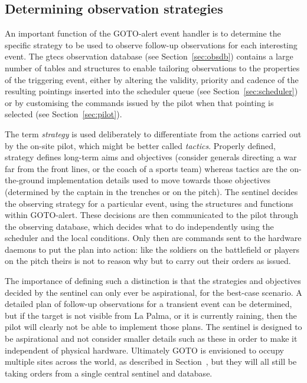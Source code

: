 \begin{colsection}
\subsection{Determining observation strategies}
\label{sec:event_strategy}
\begin{colsection}

An important function of the GOTO-alert event handler is to determine the specific strategy to be used to observe follow-up observations for each interesting event. The \gls{gtecs} observation database (see Section~\ref{sec:obsdb}) contains a large number of tables and structures to enable tailoring observations to the properties of the triggering event, either by altering the validity, priority and cadence of the resulting pointings inserted into the scheduler queue (see Section~\ref{sec:scheduler}) or by customising the commands issued by the pilot when that pointing is selected (see Section~\ref{sec:pilot}).

The term \textit{strategy} is used deliberately to differentiate from the actions carried out by the on-site pilot, which might be better called \textit{tactics}. Properly defined, strategy defines long-term aims and objectives (consider generals directing a war far from the front lines, or the coach of a sports team) whereas tactics are the on-the-ground implementation details used to move towards those objectives (determined by the captain in the trenches or on the pitch). The sentinel decides the observing strategy for a particular event, using the structures and functions within GOTO-alert. These decisions are then communicated to the pilot through the observing database, which decides what to do independently using the scheduler and the local conditions. Only then are commands sent to the hardware daemons to put the plan into action: like the soldiers on the battlefield or players on the pitch theirs is not to reason why but to carry out their orders as issued.

The importance of defining such a distinction is that the strategies and objectives decided by the sentinel can only ever be aspirational, for the best-case scenario. A detailed plan of follow-up observations for a transient event can be determined, but if the target is not visible from La Palma, or it is currently raining, then the pilot will clearly not be able to implement those plans. The sentinel is designed to be aspirational and not consider smaller details such as these in order to make it independent of physical hardware. Ultimately GOTO is envisioned to occupy multiple sites across the world, as described in Section~, but they will all still be taking orders from a single central sentinel and database.


\end{colsection}
\end{colsection}
